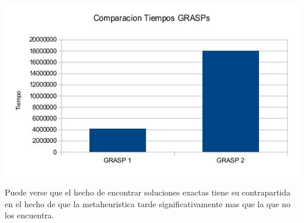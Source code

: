 \includegraphics[scale=0.5]{Ej5/tiempos.jpg}

Puede verse que el hecho de encontrar soluciones exactas tiene su contrapartida en el hecho de que la metaheuristica tarde significativamente mas que la que no los encuentra.
